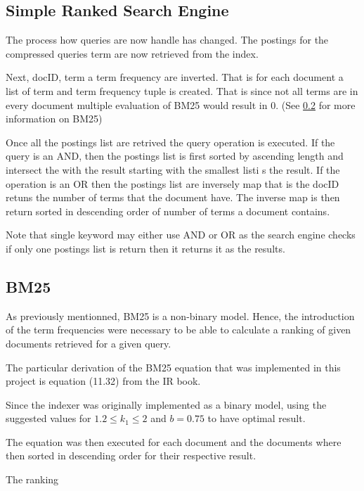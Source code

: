 \subsection{Simple Ranked Search Engine}

\par The process how queries are now handle has changed. The postings for the compressed queries term are now retrieved from the index. 
\par Next, docID, term a term frequency are inverted. That is for each document a list of term and term frequency tuple is created. That is since not all terms are in every document multiple evaluation of BM25 would result in 0. (See \ref{BM25} for more information on BM25)
\par Once all the postings list are retrived the query operation is executed. If the query is an AND, then the postings list is first sorted by ascending length and intersect the with the result starting with the smallest listi s the result. If the operation is an OR then the postings list are inversely map that is the docID retuns the number of terms that the document have. The inverse map is then return sorted in descending order of number of terms a document contains.
\par Note that single keyword may either use AND or OR as the search engine checks if only one postings list is return then it returns it as the results.

\subsection{BM25} \label{BM25}

\par As previously mentionned, BM25 is a non-binary model. Hence, the introduction of the term frequencies were necessary to be able to calculate a ranking of given documents retrieved for a given query.
\par The particular derivation of the BM25 equation that was implemented in this project is equation (11.32) from the IR book. \cite{BM25}
\par Since the indexer was originally implemented as a binary model, using the suggested values for $1.2 \leq k_1 \leq 2$ and $b=0.75$ to have optimal result.
\par The equation was then executed for each document and the documents where then sorted in descending order for their respective result.

\par The ranking

